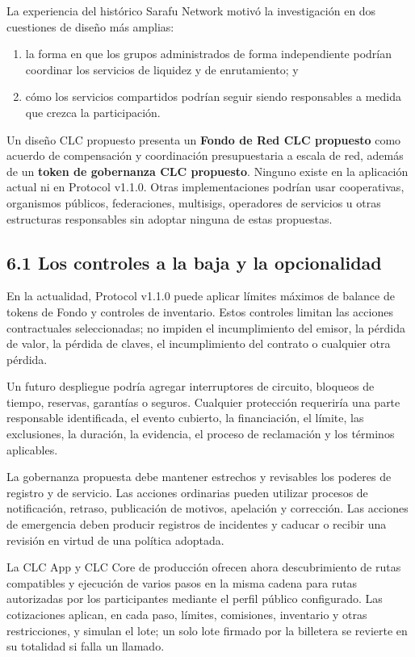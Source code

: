 \documentclass[11pt]{article}
\begin{document}
La experiencia del histórico Sarafu Network motivó la investigación en dos cuestiones de diseño más amplias:

\begin{enumerate}[leftmargin=*]
\item la forma en que los grupos administrados de forma independiente podrían coordinar los servicios de liquidez y de enrutamiento; y
\item cómo los servicios compartidos podrían seguir siendo responsables a medida que crezca la participación.
\end{enumerate}
Un diseño CLC propuesto presenta un \textbf{Fondo de Red CLC propuesto} como acuerdo de compensación y coordinación presupuestaria a escala de red, además de un \textbf{token de gobernanza CLC propuesto}. Ninguno existe en la aplicación actual ni en Protocol v1.1.0. Otras implementaciones podrían usar cooperativas, organismos públicos, federaciones, multisigs, operadores de servicios u otras estructuras responsables sin adoptar ninguna de estas propuestas.

\subsection*{6.1 Los controles a la baja y la opcionalidad}

En la actualidad, Protocol v1.1.0 puede aplicar límites máximos de balance de tokens de Fondo y controles de inventario. Estos controles limitan las acciones contractuales seleccionadas; no impiden el incumplimiento del emisor, la pérdida de valor, la pérdida de claves, el incumplimiento del contrato o cualquier otra pérdida.

Un futuro despliegue podría agregar interruptores de circuito, bloqueos de tiempo, reservas, garantías o seguros. Cualquier protección requeriría una parte responsable identificada, el evento cubierto, la financiación, el límite, las exclusiones, la duración, la evidencia, el proceso de reclamación y los términos aplicables.

La gobernanza propuesta debe mantener estrechos y revisables los poderes de registro y de servicio. Las acciones ordinarias pueden utilizar procesos de notificación, retraso, publicación de motivos, apelación y corrección. Las acciones de emergencia deben producir registros de incidentes y caducar o recibir una revisión en virtud de una política adoptada.

La CLC App y CLC Core de producción ofrecen ahora descubrimiento de rutas compatibles y ejecución de varios pasos en la misma cadena para rutas autorizadas por los participantes mediante el perfil público configurado. Las cotizaciones aplican, en cada paso, límites, comisiones, inventario y otras restricciones, y simulan el lote; un solo lote firmado por la billetera se revierte en su totalidad si falla un llamado.
\end{document}
